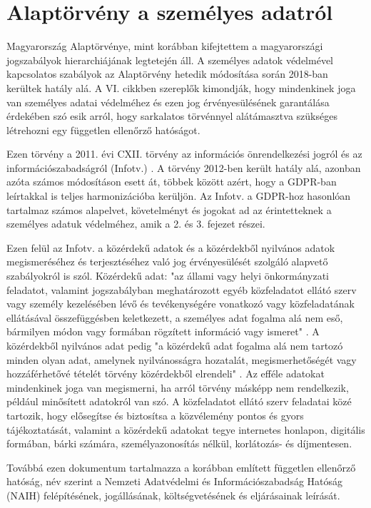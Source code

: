 \section{Alaptörvény a személyes adatról}

Magyarország Alaptörvénye, mint korábban kifejtettem a magyarországi jogszabályok hierarchiájának legtetején áll. A személyes adatok védelmével kapcsolatos szabályok az Alaptörvény hetedik módosítása során 2018-ban kerültek hatály alá. A VI. cikkben szereplők kimondják, hogy mindenkinek joga van személyes adatai védelméhez és ezen jog érvényesülésének garantálása érdekében szó esik arról, hogy  sarkalatos törvénnyel alátámasztva szükséges létrehozni egy független ellenőrző hatóságot. \cite{alaptorveny}

Ezen törvény a 2011. évi CXII. törvény az információs önrendelkezési jogról és az információszabadságról (Infotv.) \cite{2011-CXII-torveny}. A törvény 2012-ben került hatály alá, azonban azóta számos módosításon esett át, többek között azért, hogy a GDPR-ban leírtakkal is teljes harmonizációba kerüljön. Az Infotv. a GDPR-hoz hasonlóan tartalmaz számos alapelvet, követelményt és jogokat ad az érintetteknek a személyes adatuk védelméhez, amik a 2. és 3. fejezet részei.

Ezen felül az Infotv. a közérdekű adatok és a közérdekből nyilvános adatok megismeréséhez és terjesztéséhez való jog érvényesülését szolgáló alapvető szabályokról is szól. Közérdekű adat: "az állami vagy helyi önkormányzati feladatot, valamint jogszabályban meghatározott egyéb közfeladatot ellátó szerv vagy személy kezelésében lévő és tevékenységére vonatkozó vagy közfeladatának ellátásával összefüggésben keletkezett, a személyes adat fogalma alá nem eső, bármilyen módon vagy formában rögzített információ vagy ismeret" \cite{2011-CXII-torveny}. A közérdekből nyilvános adat pedig "a közérdekű adat fogalma alá nem tartozó minden olyan adat, amelynek nyilvánosságra hozatalát, megismerhetőségét vagy hozzáférhetővé tételét törvény közérdekből elrendeli" \cite{2011-CXII-torveny}. Az efféle adatokat mindenkinek joga van megismerni, ha arról törvény másképp nem rendelkezik, például minősített adatokról van szó. A közfeladatot ellátó szerv feladatai közé tartozik, hogy elősegítse és biztosítsa a közvélemény pontos és gyors tájékoztatását, valamint a közérdekű adatokat  tegye internetes honlapon, digitális formában, bárki számára, személyazonosítás nélkül, korlátozás- és díjmentesen.

Továbbá ezen dokumentum tartalmazza a korábban említett független ellenőrző hatóság, név szerint a Nemzeti Adatvédelmi és Információszabadság Hatóság (NAIH) felépítésének, jogállásának, költségvetésének és eljárásainak leírását.

